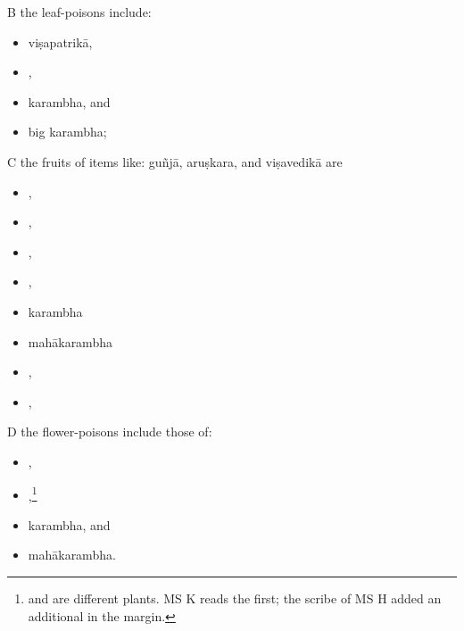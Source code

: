\begin{translation}
    
    
        \item[B]
        the leaf-poisons include:
             \begin{itemize}            
        \item \gls{viṣapatrikā},
        \item {},
        \item \gls{karambha},
        and
        \item big \gls{karambha};
            \end{itemize}
        \item[C]
        the fruits of items like:
        \gls{guñjā},
        \gls{aruṣkara},
        and
        \gls{viṣavedikā}
        are
\begin{itemize}
         \item {},	
        \item {},
    \item {},
    \item {},
    \item \gls{karambha}
    \item \gls{mahākarambha}
    \item {},
    \item {},
\end{itemize}
   
        \item[D]
        the flower-poisons include those of:
\begin{itemize}
 \item {}, 
 \item {},\footnote{ and  are 
 different plants. MS K reads the first; the scribe of MS H added an additional 
  in the margin.}
        \item \gls{karambha},
        and
        \item \gls{mahākarambha}.
\end{itemize}


\end{translation}
